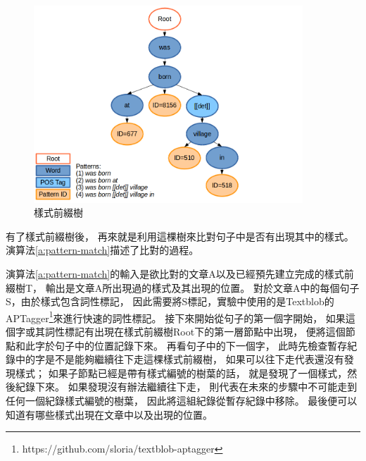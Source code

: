 \begin{figure}
    \centering
    \includegraphics[width=0.9\textwidth]{images/03-pattern-prefix-tree}
    \caption{樣式前綴樹}
    \label{i:pattern-prefix-tree}
\end{figure}

有了樣式前綴樹後，
再來就是利用這棵樹來比對句子中是否有出現其中的樣式。
演算法\ref{a:pattern-match}描述了比對的過程。

演算法\ref{a:pattern-match}的輸入是欲比對的文章A以及已經預先建立完成的樣式前綴樹T，
輸出是文章A所出現過的樣式及其出現的位置。
對於文章A中的每個句子S，由於樣式包含詞性標記，
因此需要將S標記，實驗中使用的是Textblob的APTagger\footnote{https://github.com/sloria/textblob-aptagger}來進行快速的詞性標記。
接下來開始從句子的第一個字開始，
如果這個字或其詞性標記有出現在樣式前綴樹Root下的第一層節點中出現，
便將這個節點和此字於句子中的位置記錄下來。
再看句子中的下一個字，
此時先檢查暫存紀錄中的字是不是能夠繼續往下走這棵樣式前綴樹，
如果可以往下走代表還沒有發現樣式；
如果子節點已經是帶有樣式編號的樹葉的話，
就是發現了一個樣式，然後紀錄下來。
如果發現沒有辦法繼續往下走，
則代表在未來的步驟中不可能走到任何一個紀錄樣式編號的樹葉，
因此將這組紀錄從暫存紀錄中移除。
最後便可以知道有哪些樣式出現在文章中以及出現的位置。

